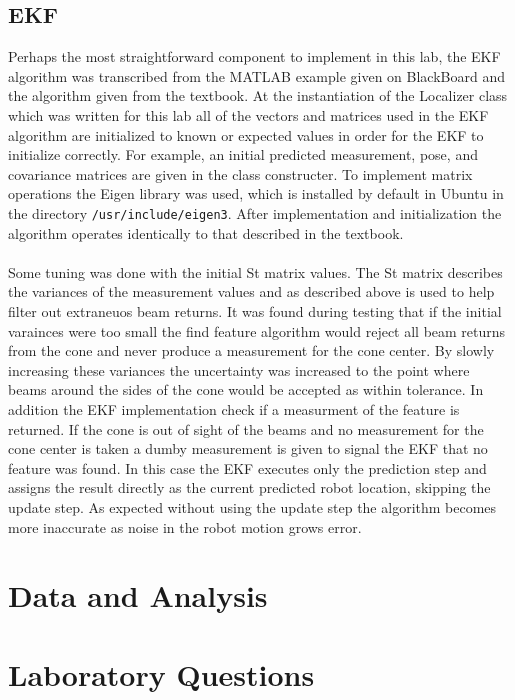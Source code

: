 \documentclass[letterpaper,12pt]{article}
\begin{document}
\subsection{EKF}
Perhaps the most straightforward component to implement in this lab, the EKF algorithm was transcribed from the MATLAB example given on BlackBoard and the algorithm given from the textbook. At the instantiation of the Localizer class which was written for this lab all of the vectors and matrices used in the EKF algorithm are initialized to known or expected values in order for the EKF to initialize correctly. For example, an initial predicted measurement, pose, and covariance matrices are given in the class constructer. To implement matrix operations the Eigen library was used, which is installed by default in Ubuntu in the directory \texttt{/usr/include/eigen3}. After implementation and initialization the algorithm operates identically to that described in the textbook.
\\\\
Some tuning was done with the initial St matrix values. The St matrix describes the variances of the measurement values and as described above is used to help filter out extraneuos beam returns. It was found during testing that if the initial varainces were too small the find feature algorithm would reject all beam returns from the cone and never produce a measurement for the cone center. By slowly increasing these variances the uncertainty was increased to the point where beams around the sides of the cone would be accepted as within tolerance. In addition the EKF implementation check if a measurment of the feature is returned. If the cone is out of sight of the beams and no measurement for the cone center is taken a dumby measurement is given to signal the EKF that no feature was found. In this case the EKF executes only the prediction step and assigns the result directly as the current predicted robot location, skipping the update step. As expected without using the update step the algorithm becomes more inaccurate as noise in the robot motion grows error. 

\section{Data and Analysis}


\section{Laboratory Questions}
  
\end{document}
